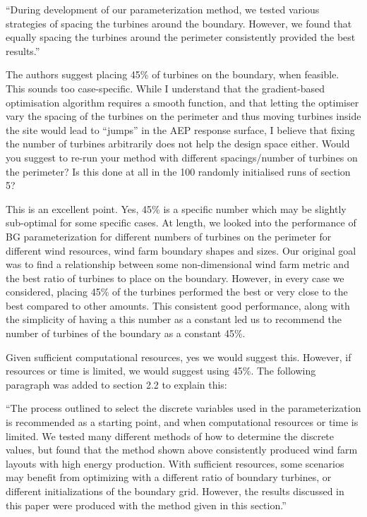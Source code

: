 \documentclass[12pt]{report}
\begin{document}
\smallskip
``During development of our parameterization method, we tested various strategies of spacing the turbines around the boundary. However, we found that equally spacing the turbines around the perimeter consistently provided the best results.''

\color{black}
\bigskip

The authors suggest placing 45\% of turbines on the boundary, when feasible. This sounds too case-specific. While I understand that the gradient-based optimisation algorithm requires a smooth function, and that letting the optimiser vary the spacing of the turbines on the perimeter and thus moving turbines inside the site would lead to ``jumps'' in the AEP response surface, I believe that fixing the number of turbines arbitrarily does not help the design space either. Would you suggest to re-run your method with different spacings/number of turbines on the perimeter? Is this done at all in the 100 randomly initialised runs of section 5? 

\bigskip
\color{blue}

This is an excellent point. Yes, 45\% is a specific number which may be slightly sub-optimal for some specific cases. At length, we looked into the performance of BG parameterization for different numbers of turbines on the perimeter for different wind resources, wind farm boundary shapes and sizes. Our original goal was to find a relationship between some non-dimensional wind farm metric and the best ratio of turbines to place on the boundary. 
However, in every case we considered, placing 45\% of the turbines performed the best or very close to the best compared to other amounts. This consistent good performance, along with the simplicity of having a this number as a constant led us to recommend the number of turbines of the boundary as a constant 45\%.

Given sufficient computational resources, yes we would suggest this. However, if resources or time is limited, we would suggest using 45\%. The following paragraph was added to section 2.2 to explain this:

\smallskip
``The process outlined to select the discrete variables used in the parameterization is recommended as a starting point, and when computational resources or time is limited. We tested many different methods of how to determine the discrete values, but found that the method shown above consistently produced wind farm layouts with high energy production. With sufficient resources, some scenarios may benefit from optimizing with a different ratio of boundary turbines, or different initializations of the boundary grid. However, the results discussed in this paper were produced with the method given in this section.''
\end{document}
